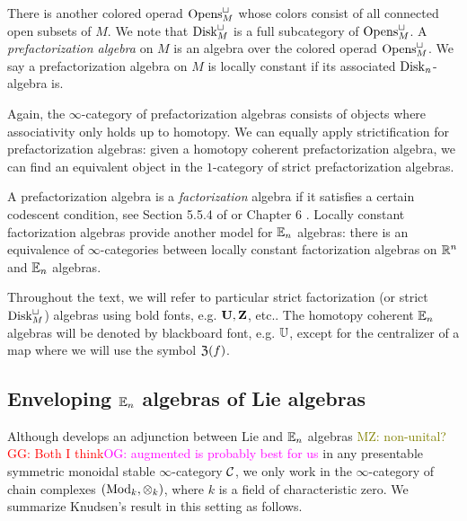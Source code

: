 \documentclass[11pt]{amsart}
\numberwithin{equation}{section}
\def\owen{\textcolor{magenta}{OG: }\textcolor{magenta}}
\def\mahmoud{\textcolor{olive}{MZ: }\textcolor{olive}}
\def\greg{\textcolor{red}{GG: }\textcolor{red}}
\begin{document}
There is another colored operad ${\rm Opens}^\sqcup_M$ whose colors consist of all connected open subsets of $M$. 
We note that ${\rm Disk}^\sqcup_M$ is a full subcategory of ${\rm Opens}^\sqcup_M$.
A {\em prefactorization algebra} on $M$ is an algebra over the colored operad ${\rm Opens}^{\sqcup}_M$. 
We say a prefactorization algebra on $M$ is locally constant if its associated ${\rm Disk}_n$-algebra is.

Again, the $\infty$-category of prefactorization algebras consists of objects where associativity only holds up to homotopy. 
We can equally apply strictification for prefactorization algebras: given a homotopy coherent prefactorization algebra, we can find an equivalent object in the $1$-category of strict prefactorization algebras. 

A prefactorization algebra is a {\em factorization} algebra if it satisfies a certain codescent condition, see Section 5.5.4 of \cite{LurieHA} or Chapter 6 \cite{CG1}. 
Locally constant factorization algebras provide another model for $\mathbb E_n$ algebras: there is an equivalence of $\infty$-categories between locally constant factorization algebras on $\mathbb R^n$ and $\mathbb E_n$ algebras. 

Throughout the text, we will refer to particular strict factorization (or strict ${\rm Disk}^\sqcup_M$) algebras using bold fonts, e.g. $\mathbf U, \mathbf Z$, etc.. 
The homotopy coherent $\mathbb E_n$ algebras will be denoted by blackboard font, e.g. $\mathbb U$, except for the centralizer of a map where we will use the symbol $\mathfrak Z(f)$. 
 
\subsection{Enveloping $\mathbb E_n$ algebras of Lie algebras}
\label{sec: enveloping}

Although \cite{Knudsen} develops an adjunction between Lie and $\mathbb E_n$ algebras \mahmoud{non-unital?}\greg{Both I think}\owen{augmented is probably best for us}
in any presentable symmetric monoidal stable $\infty$-category $\mathcal C$,
we only work in the $\infty$-category of chain complexes $({\rm Mod}_k, \otimes_k)$, 
where $k$ is a field of characteristic zero.
We summarize Knudsen's result in this setting as follows.
\end{document}
